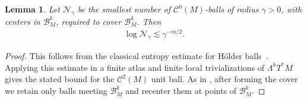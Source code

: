 \documentclass[11pt,reqno]{amsproc}
\numberwithin{equation}{section}
\newcommand{\cN}{\mathcal{N}}
\newcommand{\cB}{\mathcal{B}}
\newcommand{\cC}{\mathcal{C}}
\newcommand{\ls}{\lesssim}
\newtheorem{lemma}[counter]{Lemma}
\theoremstyle{definition}
\theoremstyle{plain}
\begin{document}
\begin{lemma} \label{lem:codiff_covering_bound}
    Let $\cN_\gamma$ be the smallest number of $\cC^0(M)$-balls of radius $\gamma>0$, with centers in $\cB_M^k$, required to cover $\cB_M^k$. Then
    \begin{align}
        \log \cN_\gamma\ls \gamma^{-m/2}.
    \end{align}
\end{lemma}
\begin{proof}
        This follows from the classical entropy estimate for Hölder balls~\cite[Theorem 2.7.1]{vaart_weak_2023}. Applying this estimate in a finite atlas and finite local trivializations of $\Lambda^kT^*M$ gives the stated bound for the $\cC^2(M)$ unit ball. As in , after forming the cover we retain only balls meeting $\cB_M^k$ and recenter them at points of $\cB_M^k$.
\end{proof}
\end{document}
